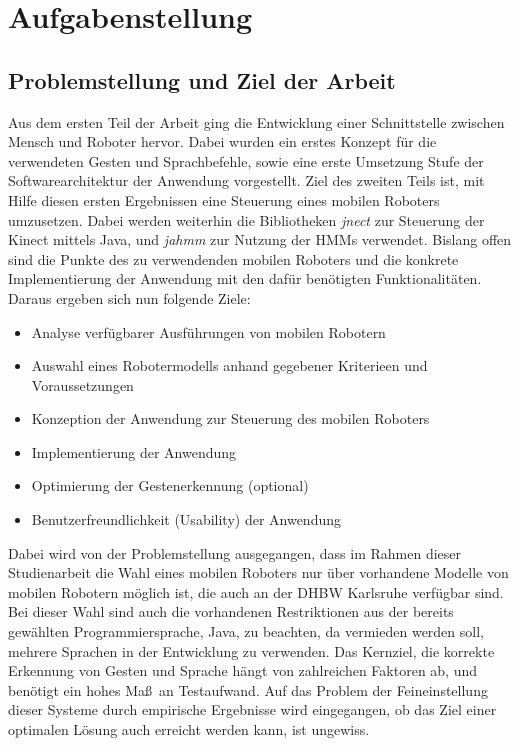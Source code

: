 \chapter{Aufgabenstellung}
\label{chap:Aufgabenstellung}

\section{Problemstellung und Ziel der Arbeit}
\label{sec:Problemstellung und Ziel der Arbeit}
Aus dem ersten Teil der Arbeit ging die Entwicklung einer Schnittstelle zwischen Mensch und Roboter hervor. Dabei wurden ein erstes Konzept f\"ur die verwendeten Gesten und Sprachbefehle, sowie eine erste Umsetzung Stufe der Softwarearchitektur der Anwendung vorgestellt. Ziel des zweiten Teils ist, mit Hilfe diesen ersten Ergebnissen eine Steuerung eines mobilen Roboters umzusetzen. Dabei werden weiterhin die Bibliotheken \textit{jnect} zur Steuerung der Kinect mittels Java, und \textit{jahmm} zur Nutzung der \glspl{HMM} verwendet. Bislang offen sind die Punkte des zu verwendenden mobilen Roboters und die konkrete Implementierung der Anwendung mit den daf\"ur ben\"otigten Funktionalit\"aten.
\newline
Daraus ergeben sich nun folgende Ziele:
\begin{itemize}
\item Analyse verf\"ugbarer Ausf\"uhrungen von mobilen Robotern
\item Auswahl eines Robotermodells anhand gegebener Kriterieen und Voraussetzungen
\item Konzeption der Anwendung zur Steuerung des mobilen Roboters
\item Implementierung der Anwendung
\item Optimierung der Gestenerkennung (optional)
\item Benutzerfreundlichkeit (Usability) der Anwendung
\end{itemize}
Dabei wird von der Problemstellung ausgegangen, dass im Rahmen dieser Studienarbeit die Wahl eines mobilen Roboters nur \"uber vorhandene Modelle von mobilen Robotern m\"oglich ist, die auch an der DHBW Karlsruhe verf\"ugbar sind. Bei dieser Wahl sind auch die vorhandenen Restriktionen aus der bereits gew\"ahlten Programmiersprache, Java, zu beachten, da vermieden werden soll, mehrere Sprachen in der Entwicklung zu verwenden.
\newline
Das Kernziel, die korrekte Erkennung von Gesten und Sprache h\"angt von zahlreichen Faktoren ab, und ben\"otigt ein hohes Ma\ss~an Testaufwand. Auf das Problem der Feineinstellung dieser Systeme durch empirische Ergebnisse wird eingegangen, ob das Ziel einer optimalen L\"osung auch erreicht werden kann, ist ungewiss.

